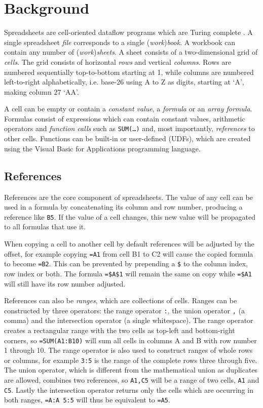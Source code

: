 \documentclass[times]{smrauth}
\begin{document}
\section{Background}

Spreadsheets are cell-oriented dataflow programs which are Turing complete \cite{ExcelTuringComplete}.
A single spreadsheet \emph{file} corresponds to a single (\emph{work})\emph{book}.
A workbook can contain any number of (\emph{work})\emph{sheets}.
A sheet consists of a two-dimensional grid of \emph{cells}.
The grid consists of horizontal \emph{rows} and vertical \emph{columns}.
Rows are numbered sequentially top-to-bottom starting at 1, while columns are numbered left-to-right alphabetically, i.e. base-26 using A to Z as digits, starting at `A', making column 27 `AA'.

A cell can be empty or contain a \emph{constant value}, a \emph{formula} or an \emph{array formula}.
Formulas consist of expressions which can contain constant values, arithmetic operators and \emph{function calls} such as \texttt{SUM(\ldots)} and, most importantly, \emph{references} to other cells.
Functions can be built-in or user-defined (UDFs), which are created using the Visual Basic for Applications programming language.

\subsection{References}
References are the core component of spreadsheets.
The value of any cell can be used in a formula by concatenating its column and row number, producing a reference like \texttt{B5}.
If the value of a cell changes, this new value will be propagated to all formulas that use it.

When copying a cell to another cell by default references will be adjusted by the offset, for example copying \texttt{=A1} from cell B1 to C2 will cause the copied formula to become \texttt{=B2}.
This can be prevented by prepending a \texttt{\$} to the column index, row index or both.
The formula \texttt{=\$A\$1} will remain the same on copy while \texttt{=\$A1} will still have its row number adjusted.

References can also be \emph{ranges}, which are collections of cells.
Ranges can be constructed by three operators: the range operator \texttt{:}, the union operator \texttt{,} (a comma) and the intersection operator \texttt{} (a single whitespace).
The range operator creates a rectangular range with the two cells as top-left and bottom-right corners, so \texttt{=SUM(A1:B10)} will sum all cells in columns A and B with row number 1 through 10.
The range operator is also used to construct ranges of whole rows or columns, for example \texttt{3:5} is the range of the complete rows three through five.
The union operator, which is different from the mathematical union as duplicates are allowed, combines two references, so \texttt{A1,C5} will be a range of two cells, \texttt{A1} and \texttt{C5}.
Lastly the intersection operator returns only the cells which are occurring in both ranges, \texttt{=A:A 5:5} will thus be equivalent to \texttt{=A5}.
\end{document}
